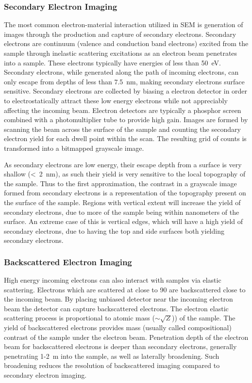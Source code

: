 \subsubsection{Secondary Electron Imaging} The most common electron-material interaction utilized in SEM is generation of images through the production and capture of secondary electrons.
Secondary electrons are continuum (valence and conduction band electrons) excited from the sample through inelastic scattering excitations as an electron beam penetrates into a sample.
These electrons typically have energies of less than 50~eV\cite{goldstein2003scanning}.
Secondary electrons, while generated along the path of incoming electrons, can only escape from depths of less than 7.5~nm, making secondary electrons surface sensitive\cite{goldstein2003scanning}.
Secondary electrons are collected by biasing a electron detector in order to electrostatically attract these low energy electrons while not appreciably affecting the incoming beam.
Electron detectors are typically a phosphor screen combined with a photomultiplier tube to provide high gain.
Images are formed by scanning the beam across the surface of the sample and counting the secondary electron yield for each dwell point within the scan.
The resulting grid of counts is transformed into a bitmapped grayscale image.

As secondary electrons are low energy, their escape depth from a surface is very shallow (<~2~nm), as such their yield is very sensitive to the local topography of the sample.
Thus to the first approximation, the contrast in a grayscale image formed from secondary electrons is a representation of the topography present on the surface of the sample.
Regions with vertical extent will increase the yield of secondary electrons, due to more of the sample being within nanometers of the surface.
An extreme case of this is vertical edges, which will have a high yield of secondary electrons, due to having the top and side surfaces both yielding secondary electrons.

\subsubsection{Backscattered Electron Imaging} High energy incoming electrons can also interact with samples via elastic scattering.
Electrons which are scattered at close to 90\degree{} are backscattered close to the incoming beam.
By placing unbiased detector near the incoming electron beam the detector can capture backscattered electrons.
The electron elastic scattering process is proportional to atomic mass (\(\sim\)\(\sqrt{Z}\))) of the sample.
The yield of backscattered electrons provides mass (usually called compositional) contrast of the sample under the electron beam.
Penetration depth of the electron beam for backscattered electrons is deeper than secondary electrons, generally penetrating 1-2~\micro{}m into the sample, as well as laterally broadening.
Such broadening reduces the resolution of backscattered imaging compared to secondary electron imaging.

